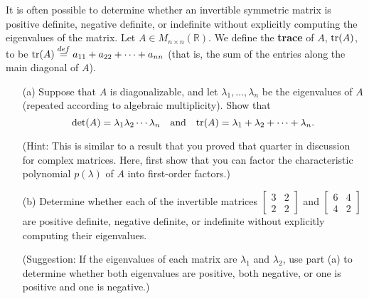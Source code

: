 \documentclass[11pt,letterpaper,cm]{nupset}
\newcommand{\bmat}[1]{\begin{bmatrix} #1 \end{bmatrix}}
\begin{document}
\begin{problem}[Exercise 1] It is often possible to determine whether an invertible symmetric matrix is positive definite, negative definite, or indefinite without explicitly computing the eigenvalues of the matrix.  Let $A\in M_{n\times n}(\mathbb{R})$.  We define the \textbf{trace} of $A$, ${\rm tr}(A)$, to be ${\rm tr}(A)\stackrel{def}{=} a_{11}+a_{22}+\cdots+a_{nn}$ (that is, the sum of the entries along the main diagonal of $A$).
	\begin{itemize}
		\item[(a)] Suppose that $A$ is diagonalizable, and let $\lambda_1,\ldots,\lambda_n$ be the eigenvalues of $A$ (repeated according to algebraic multiplicity). Show that $${\rm det}(A)=\lambda_1\lambda_2\cdots \lambda_n\quad\mbox{and}\quad {\rm tr}(A)=\lambda_1+\lambda_2+\cdots+\lambda_n.$$
		
		(Hint: This is similar to a result that you proved that quarter in discussion for complex matrices. Here, first show that you can factor the characteristic polynomial $p(\lambda)$ of $A$ into first-order factors.)
		\item[(b)] Determine whether each of the invertible matrices $\bmat{3 & 2\\ 2 & 2}$ and $\bmat{6 & 4\\ 4 & 2}$ are positive definite, negative definite, or indefinite without explicitly computing their eigenvalues.
		\medskip
		
		(Suggestion: If the eigenvalues of each matrix are $\lambda_1$ and $\lambda_2$, use part (a) to determine whether both eigenvalues are positive, both negative, or one is positive and one is negative.)
	\end{itemize}
\end{problem}
\end{document}
